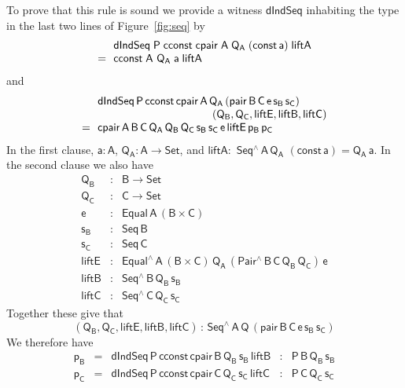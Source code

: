 \documentclass[sigplan,screen]{acmart}
\begin{document}
To prove that this rule is sound we provide a witness
$\mathsf{dIndSeq}$ inhabiting the type in the last two lines of
Figure~\ref{fig:seq} by
\[\begin{array}{ll}
& \!\!\mathsf{dIndSeq\;P\;cconst\;cpair\;A\;Q_A\;(const\,a)\;liftA}\\
= & \!\!\mathsf{cconst\;A}$ $\mathsf{Q_A\;a\;liftA}
\end{array}\]
and
\[\begin{array}{ll}
 &\!\!\mathsf{dIndSeq\,P\,cconst\,cpair\,A\,Q_A\,(pair\,B\,C\,e\,s_B\,s_C)}\\
 & \hspace*{1.4in}\mathsf{(Q_B, Q_C, liftE, liftB, liftC)}\\
= &\!\! \mathsf{cpair\,A\,B\,C\,Q_A\,Q_B\,Q_C\,s_B\,s_C\,e\,liftE\,
  p_B\,p_C}
\end{array}\]
In the first clause, $\mathsf{a : A}$, $\mathsf{Q_A : A \to Set}$, and
$\mathsf{liftA :}$ $\mathsf{Seq^{\wedge}\,A\,Q_A}$ $\mathsf{(const\,a)
  = Q_A\,a}$. In the second clause we also have
\[\begin{array}{lll}
\mathsf{Q_B} & : & \mathsf{B \to Set}\\
\mathsf{Q_C} & : & \mathsf{C \to Set}\\
\mathsf{e}  & : & \mathsf{Equal\,A\,(B \times C)}\\
\mathsf{s_B} & : & \mathsf{Seq\,B}\\
\mathsf{s_C} & : & \mathsf{Seq\,C}\\
\mathsf{liftE} & : & \mathsf{Equal^{\wedge}\,A\, (B \times C)\, Q_A\,
  (Pair^\wedge \,B\,C\,Q_B\,Q_C) \, e}\\
\mathsf{liftB} & : & \mathsf{Seq^{\wedge}\,B\,Q_B\,s_B}\\
\mathsf{liftC} & : & \mathsf{Seq^{\wedge}\,C\,Q_C\,s_C}
\end{array}\]
Together these give that
\[\mathsf{(Q_B, Q_C, liftE,liftB, liftC)
\, :\,  Seq^{\wedge}\,A\,Q\,(pair\,B\,C\,e\,s_B\,s_C)}\]
We therefore have
\[\begin{array}{lllll}
\mathsf{p_B}\!\! & = & \!\!\mathsf{dIndSeq\,P
  \,cconst\,cpair\,B\,Q_B\,s_B\,liftB} \!\! & : & 
\!\!\mathsf{P\,B\,Q_B\,s_B}\\
\mathsf{p_C}\!\! & = & \!\!\mathsf{dIndSeq\,P\,
  cconst\,cpair\,C\,Q_C\,s_C\,liftC}\!\! & : &\!\! \mathsf{P\,C\,Q_C\,s_C} 
\end{array}\]
\end{document}
